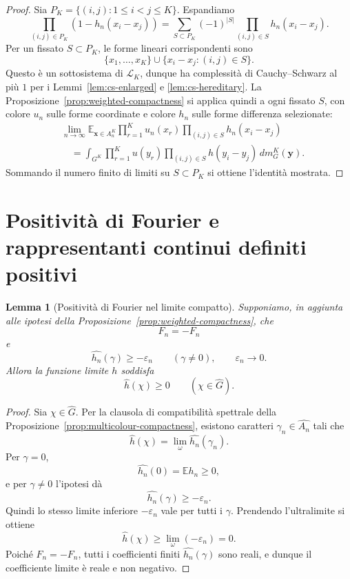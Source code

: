 \documentclass[11pt]{article}
\numberwithin{equation}{section}
\newtheorem{lemma}[theorem]{Lemma}
\newcommand{\E}{\mathbb E}
\newcommand{\1}{\mathbf 1}
\begin{document}
\begin{proof}
Sia \(P_K=\{(i,j):1\le i<j\le K\}\). Espandiamo
\[
        \prod_{(i,j)\in P_K}(1-h_n(x_i-x_j))
        =
        \sum_{S\subset P_K}(-1)^{|S|}
        \prod_{(i,j)\in S}h_n(x_i-x_j).
\]
Per un fissato \(S\subset P_K\), le forme lineari corrispondenti sono
\[
        \{x_1,\ldots,x_K\}
        \cup
        \{x_i-x_j:(i,j)\in S\}.
\]
Questo è un sottosistema di \(\mathcal L_K\), dunque ha complessità di Cauchy--Schwarz al più \(1\) per i Lemmi~\ref{lem:cs-enlarged} e \ref{lem:cs-hereditary}. La Proposizione~\ref{prop:weighted-compactness} si applica quindi a ogni fissato \(S\), con colore \(u_n\) sulle forme coordinate e colore \(h_n\) sulle forme differenza selezionate:
\[
\begin{aligned}
&\lim_{n\to\infty}
\E_{\mathbf x\in A_n^K}
        \prod_{r=1}^K u_n(x_r)
        \prod_{(i,j)\in S}h_n(x_i-x_j) \\
&\quad =
\int_{G^K}
        \prod_{r=1}^K u(y_r)
        \prod_{(i,j)\in S}h(y_i-y_j)
        \,dm_G^K(\mathbf y).
\end{aligned}
\]
Sommando il numero finito di limiti su \(S\subset P_K\) si ottiene l'identità mostrata.
\end{proof}

\section{Positività di Fourier e rappresentanti continui definiti positivi}
\label{sec:fourier-positive}

\begin{lemma}[Positività di Fourier nel limite compatto]
\label{lem:limit-fourier-positive}
Supponiamo, in aggiunta alle ipotesi della Proposizione~\ref{prop:weighted-compactness}, che
\[
        F_n=-F_n
\]
e
\[
        \widehat{h_n}(\gamma)\ge-\varepsilon_n
        \qquad(\gamma\ne0),
        \qquad
        \varepsilon_n\to0.
\]
Allora la funzione limite \(h\) soddisfa
\[
        \widehat h(\chi)\ge0
        \qquad(\chi\in\widehat G).
\]
\end{lemma}

\begin{proof}
Sia \(\chi\in\widehat G\). Per la clausola di compatibilità spettrale della Proposizione~\ref{prop:multicolour-compactness}, esistono caratteri \(\gamma_n\in\widehat{A_n}\) tali che
\[
        \widehat h(\chi)=\lim_\omega \widehat{h_n}(\gamma_n).
\]
Per \(\gamma=0\),
\[
        \widehat{h_n}(0)=\E h_n\ge0,
\]
e per \(\gamma\ne0\) l'ipotesi dà
\[
        \widehat{h_n}(\gamma)\ge-\varepsilon_n.
\]
Quindi lo stesso limite inferiore \(-\varepsilon_n\) vale per tutti i \(\gamma\). Prendendo l'ultralimite si ottiene
\[
        \widehat h(\chi)
        \ge
        \lim_\omega(-\varepsilon_n)=0.
\]
Poiché \(F_n=-F_n\), tutti i coefficienti finiti \(\widehat{h_n}(\gamma)\) sono reali, e dunque il coefficiente limite è reale e non negativo.
\end{proof}
\end{document}
